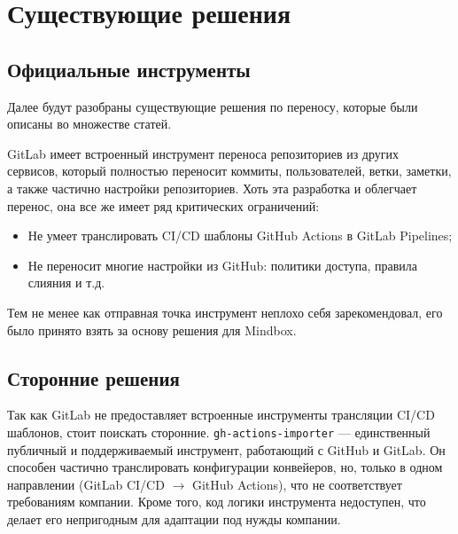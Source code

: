 \section{Существующие решения}\label{sec:existing-solutions}
\subsection{Официальные инструменты} \label{subsec:official-migration-instruments}
Далее будут разобраны существующие решения по переносу, которые были описаны во множестве статей.

GitLab имеет встроенный инструмент переноса репозиториев из других сервисов,
который полностью переносит коммиты, пользователей, ветки, заметки, а также частично настройки репозиториев.
Хоть эта разработка и облегчает перенос, она все же имеет ряд критических ограничений:
\begin{itemize}
  \item Не умеет транслировать CI/CD шаблоны GitHub Actions в GitLab Pipelines;
  \item Не переносит многие настройки из GitHub: политики доступа, правила слияния и т.д.
\end{itemize}
Тем не менее как отправная точка инструмент неплохо себя зарекомендовал, его было принято взять за основу решения для Mindbox.

\subsection{Сторонние решения} \label{subsec:third-party-migration-instruments}
Так как GitLab не предоставляет встроенные инструменты трансляции CI/CD шаблонов, стоит поискать сторонние.
\texttt{gh-actions-importer}\cite{gh-actions-migrator} — единственный публичный и поддерживаемый инструмент, работающий с GitHub и GitLab.
Он способен частично транслировать конфигурации конвейеров, но, только в одном направлении (GitLab CI/CD $\rightarrow$ GitHub Actions),
что не соответствует требованиям компании.
Кроме того, код логики инструмента недоступен, что делает его непригодным для адаптации под нужды компании.

